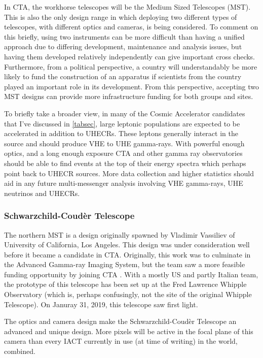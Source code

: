 In CTA, the workhorse telescopes will be the Medium Sized Telescopes (MST). This is also the only design range in which deploying two different types of telescopes, with different optics and cameras, is being considered. To comment on this briefly, using two instruments can be more difficult than having a unified approach due to differing development, maintenance and analysis issues, but having them developed relatively independently can give important cross checks. Furthermore, from a political perspective, a country will understandably be more likely to fund the construction of an apparatus if scientists from the country played an important role in its development. From this perspective, accepting two MST designs can provide more infrastructure funding for both groups and sites.

To briefly take a broader view, in many of the Cosmic Accelerator candidates that I've discussed in \autoref{tabsec}, large leptonic populations are expected to be accelerated in addition to UHECRs. These leptons generally interact in the source and should produce VHE to UHE gamma-rays. With powerful enough optics, and a long enough exposure CTA and other gamma ray observatories should be able to find events at the top of their energy spectra which perhaps point back to UHECR sources. More data collection and higher statistics should aid in any future multi-messenger analysis involving VHE gamma-rays, UHE neutrinos and UHECRs. 

\subsubsection{Schwarzchild-Coud\`{e}r Telescope}
The northern MST is a design originally spawned by Vladimir Vassiliev of University of California, Los Angeles. This design was under consideration well before it became a candidate in CTA. Originally, this work was to culminate in the Advanced Gamma-ray Imaging System, but the team saw a more feasible funding opportunity by joining CTA \cite{agis}. With a mostly US and partly Italian team, the prototype of this telescope has been set up at the Fred Lawrence Whipple Observatory (which is, perhaps confusingly, not the site of the original Whipple Telescope). On Januray 31, 2019, this telescope saw first light. 

The optics and camera design make the Schwarzchild-Coud\`{e}r Telescope an advanced and unique design. More pixels will be active in the focal plane of this camera than every IACT currently in use (at time of writing) in the world, combined.


